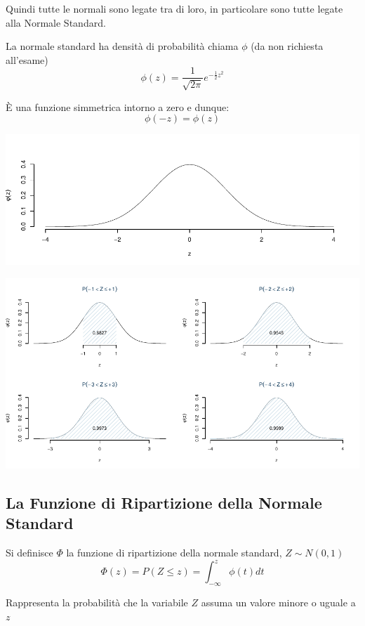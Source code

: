 \documentclass[
  11pt,
]{book}
\theoremstyle{mytheoremstyle}
\theoremstyle{mydefstyle}
\begin{document}
Quindi tutte le normali sono legate tra di loro, in particolare sono tutte legate alla Normale Standard.

La normale standard ha densità di probabilità chiama \(\phi\) (da non richiesta all'esame)
\[
\phi(z)=\frac 1 {\sqrt{2\pi}}e^{-\frac 1 2 z^2}
\]

È una funzione simmetrica intorno a zero e dunque:
\[\phi(-z)=\phi(z)\]

\begin{center}\includegraphics{Appunti_di_Statistica_2025_files/figure-latex/07c-Normale-5-1} \end{center}

\begin{center}\includegraphics{Appunti_di_Statistica_2025_files/figure-latex/07c-Normale-6-1} \end{center}

\subsection{La Funzione di Ripartizione della Normale Standard}\label{la-funzione-di-ripartizione-della-normale-standard}

Si definisce \(\Phi\) la funzione di ripartizione della normale standard, \(Z\sim N(0,1)\)
\[\Phi(z)=P(Z\leq z)=\int_{-\infty}^z\phi(t)dt\]

Rappresenta la probabilità che la variabile \(Z\) assuma un valore minore o uguale a \(z\)
\end{document}
